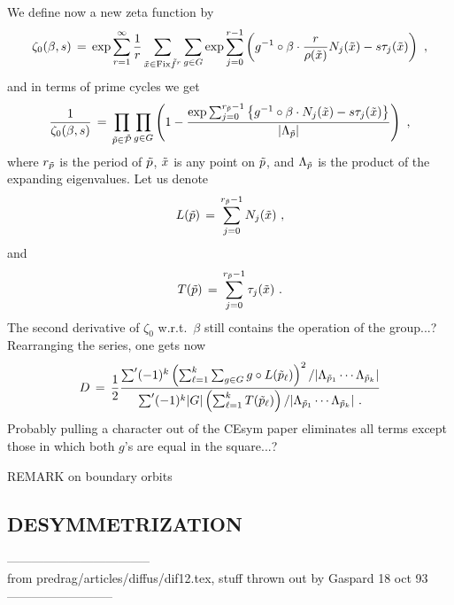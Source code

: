 We define now a new zeta function by
$$
\zeta_0(\beta,s) \,=\, \exp
\sum_{r=1}^\infty {1\over r}
\sum_{\tilde{x}\in {\rm Fix}\tilde f^r}
\sum _{g\in G}
\exp\sum_{j=0}^{r-1}
\left ({ g^{-1}\circ\beta \cdot {r\over \rho(\tilde{x})} N_j(\tilde{x})
-s\tau_j(\tilde{x})}\right )~, $$
and in terms of prime cycles we get
$$
{1\over \zeta_0(\beta ,s)} \,=\,
\prod _{\tilde p\in \tilde {\cal P}}\prod_{g\in G}
\left (1-{\exp\sum_{j=0}^{r_{\tilde p}-1} \left \{{
g^{-1}\circ\beta\cdot
N_j(\tilde{x}) -s \tau_j(\tilde{x})}\right \}\over
|\Lambda_{\tilde p}|}\right )~, $$ where $r_{\tilde p}$ is the period of $\tilde p$, $\tilde{x}$ is any point
on $\tilde p$,
and $\Lambda_{\tilde p}$ is the product of the expanding eigenvalues.
Let us denote
$$
L(\tilde p) \,=\, \sum_{j=0}^{r_{\tilde p}-1} N_j(\tilde{x})~,
$$
and
$$
T(\tilde p) \,=\, \sum_{j=0}^{r_{\tilde p}-1} \tau_j(\tilde{x})~.
$$
The second derivative of $\zeta_0$ w.r.t.~$\beta$ still contains the operation of
the group...?
Rearranging the series, one gets now
$$
D \,=\,  {1\over 2}
{
\mathop{{\sum}'} (-1)^k
\left (\sum_{\ell=1}^{k}\sum_{g\in G}
g\circ L(\tilde p_\ell) \right )^2 /
|\Lambda_{\tilde p_1}\cdots \Lambda_{\tilde p_k}|
\over
\mathop{{\sum}'} (-1)^k |G| \left (\sum_{\ell=1}^{k}
 T(\tilde p_\ell) \right ) /
|\Lambda_{\tilde p_1}\cdots \Lambda_{\tilde p_k}|
~.
}
$$
Probably pulling a character out of the CEsym paper eliminates all terms except
those in which both $g$'s are equal in the square...?

REMARK on boundary orbits


\subsection{DESYMMETRIZATION}

-----------------------------------\\
from predrag/articles/diffus/dif12.tex, stuff thrown out by Gaspard 18 oct 93
\\--------------------------


